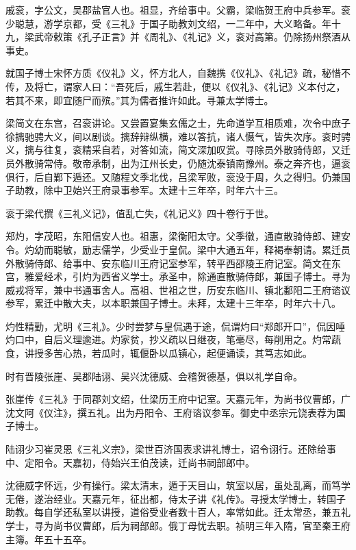 \documentclass[]{article}
\begin{document}
戚衮，字公文，吴郡盐官人也。祖显，齐给事中。父霸，梁临贺王府中兵参军。衮少聪慧，游学京都，受《三礼》于国子助教刘文绍，一二年中，大义略备。年十九，梁武帝敕策《孔子正言》并《周礼》、《礼记》义，衮对高第。仍除扬州祭酒从事史。

就国子博士宋怀方质《仪礼》义，怀方北人，自魏携《仪礼》、《礼记》疏，秘惜不传，及将亡，谓家人曰：``吾死后，戚生若赴，便以《仪礼》、《礼记》义本付之，若其不来，即宜随尸而殡。''其为儒者推许如此。寻兼太学博士。

梁简文在东宫，召衮讲论。又尝置宴集玄儒之士，先命道学互相质难，次令中庶子徐摛驰骋大义，间以剧谈。摛辞辩纵横，难以答抗，诸人慑气，皆失次序。衮时骋义，摛与往复，衮精采自若，对答如流，简文深加叹赏。寻除员外散骑侍郎，又迁员外散骑常侍。敬帝承制，出为江州长史，仍随沈泰镇南豫州。泰之奔齐也，逼衮俱行，后自鄴下遁还。又随程文季北伐，吕梁军败，衮没于周，久之得归。仍兼国子助教，除中卫始兴王府录事参军。太建十三年卒，时年六十三。

衮于梁代撰《三礼义记》，值乱亡失，《礼记义》四十卷行于世。

郑灼，字茂昭，东阳信安人也。祖惠，梁衡阳太守。父季徽，通直散骑侍郎、建安令。灼幼而聪敏，励志儒学，少受业于皇侃。梁中大通五年，释褐奉朝请。累迁员外散骑侍郎、给事中、安东临川王府记室参军，转平西邵陵王府记室。简文在东宫，雅爱经术，引灼为西省义学士。承圣中，除通直散骑侍郎，兼国子博士。寻为威戎将军，兼中书通事舍人。高祖、世祖之世，历安东临川、镇北鄱阳二王府谘议参军，累迁中散大夫，以本职兼国子博士。未拜，太建十三年卒，时年六十八。

灼性精勤，尤明《三礼》。少时尝梦与皇侃遇于途，侃谓灼曰``郑郎开口''，侃因唾灼口中，自后义理逾进。灼家贫，抄义疏以日继夜，笔毫尽，每削用之。灼常蔬食，讲授多苦心热，若瓜时，辄偃卧以瓜镇心，起便诵读，其笃志如此。

时有晋陵张崖、吴郡陆诩、吴兴沈德威、会稽贺德基，俱以礼学自命。

张崖传《三礼》于同郡刘文绍，仕梁历王府中记室。天嘉元年，为尚书仪曹郎，广沈文阿《仪注》，撰五礼。出为丹阳令、王府谘议参军。御史中丞宗元饶表荐为国子博士。

陆诩少习崔灵恩《三礼义宗》，梁世百济国表求讲礼博士，诏令诩行。还除给事中、定阳令。天嘉初，侍始兴王伯茂读，迁尚书祠部郎中。

沈德威字怀远，少有操行。梁太清末，遁于天目山，筑室以居，虽处乱离，而笃学无倦，遂治经业。天嘉元年，征出都，侍太子讲《礼传》。寻授太学博士，转国子助教。每自学还私室以讲授，道俗受业者数十百人，率常如此。迁太常丞，兼五礼学士，寻为尚书仪曹郎，后为祠部郎。俄丁母忧去职。祯明三年入隋，官至秦王府主簿。年五十五卒。
\end{document}

